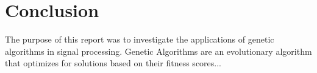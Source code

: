 \documentclass[a4paper, 11pt]{article}
\begin{document}
\section{Conclusion}\label{sec:conc}
    The purpose of this report was to investigate the applications of genetic algorithms in signal processing. Genetic Algorithms
    are an evolutionary algorithm that optimizes for solutions based on their fitness scores...
    

\pagebreak

\renewcommand{\bibname}{References}
\renewcommand{\bibsection}{\section{\bibname}}
\renewcommand{\cite}{\citep}

\pagebreak
\end{document}
